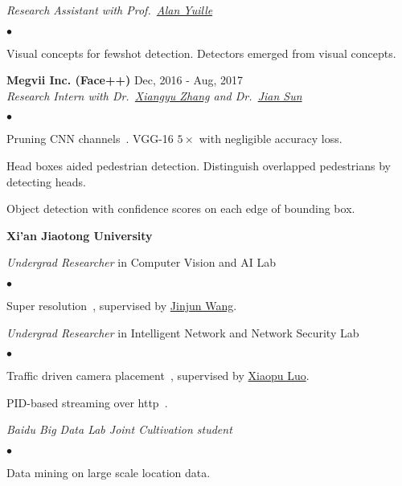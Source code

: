 \documentclass[margin,line]{res}
\newenvironment{list2}{
  \begin{list}{$\bullet$}{%
      \setlength{\itemsep}{0in}
      \setlength{\parsep}{0in} \setlength{\parskip}{0in}
      \setlength{\topsep}{0in} \setlength{\partopsep}{0in} 
      \setlength{\leftmargin}{0.2in}}}{\end{list}}
\begin{document}
\begin{resume}
\vspace{-.3in}
{\em Research Assistant with Prof.~\href{http://www.cs.jhu.edu/~ayuille/}{Alan Yuille}}
\begin{list2}
\item Visual concepts for fewshot detection. Detectors emerged from visual concepts.
\end{list2}

{\bf Megvii Inc. (Face++)} \hfill {Dec, 2016 - Aug, 2017}\\%

\vspace{-.3in}
{\em Research Intern with Dr.~\href{https://scholar.google.com/citations?user=yuB-cfoAAAAJ&hl=en&oi=ao}{Xiangyu Zhang} and Dr.~\href{http://www.jiansun.org/}{Jian Sun}} %
\begin{list2}
\item Pruning CNN channels~\cite{He_2017_ICCV}. VGG-16 $5\times$ with negligible accuracy loss.
\item Head boxes aided pedestrian detection. Distinguish overlapped pedestrians by detecting heads.
\item Object detection with confidence scores on each edge of bounding box.
\end{list2}

{\bf Xi'an Jiaotong University} %
\vspace{-.3cm}

{\em Undergrad Researcher} in Computer Vision and AI Lab %
\begin{list2}
\item Super resolution~\cite{liang2017single}, supervised by \href{https://scholar.google.com/citations?user=Dk7JgNcAAAAJ&hl=en}{Jinjun Wang}.
\end{list2}

{\em Undergrad Researcher} in Intelligent Network and Network Security Lab%
\begin{list2}
\item Traffic driven camera placement~\cite{ma2017vehicle}, supervised by \href{http://www4.comp.polyu.edu.hk/~csxluo/}{Xiaopu Luo}.
\item PID-based streaming over http~\cite{pid}.
\end{list2}

{\em Baidu Big Data Lab Joint Cultivation student} %
\begin{list2}
\item Data mining on large scale location data.
\end{list2}


\end{resume}
\end{document}
